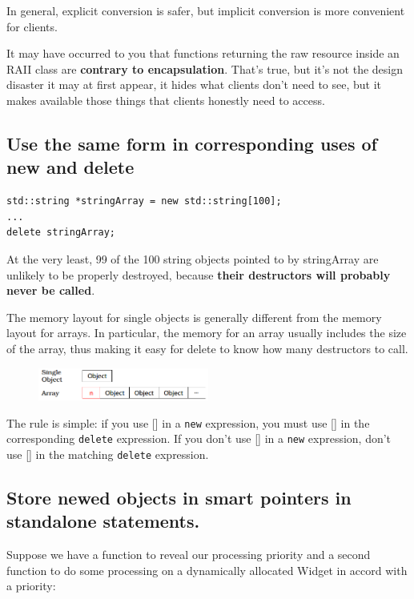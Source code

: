 \documentclass[a4paper,twoside]{article}
\theoremstyle{definition}
\theoremstyle{remark}
\numberwithin{equation}{section}
\let\OldTexttt\texttt
\renewcommand{\texttt}[1]{{\color{blue} \OldTexttt{#1}}}
\begin{document}
In general, explicit conversion is safer, but implicit conversion is
more convenient for clients.

It may have occurred to you that functions returning the raw resource
inside an RAII class are \textbf{contrary to encapsulation}.  That's
true, but it's not the design disaster it may at first appear, it
hides what clients don't need to see, but it makes available those
things that clients honestly need to access.

\subsection{Use the same form in corresponding uses of new and delete}
\label{sec:Item-16}

\begin{verbatim}
std::string *stringArray = new std::string[100];
...
delete stringArray;
\end{verbatim}

At the very least, 99 of the 100 string objects pointed to by stringArray
are unlikely to be properly destroyed, because \textbf{their
  destructors will probably never be called}.

The memory layout for single objects is generally different
from the memory layout for arrays. In particular, the memory for an
array usually includes the size of the array, thus making it easy for
delete to know how many destructors to call.

\begin{figure}[H]
  \centering
  \includegraphics[width = 0.5\textwidth]{ArrayMemLayout.png}
\end{figure}

The rule is simple: if you use [] in a \texttt{new} expression, you
must use [] in the corresponding \texttt{delete} expression. If you
don't use [] in a \texttt{new} expression, don't use [] in the
matching \texttt{delete} expression.

\subsection{Store newed objects in smart pointers in standalone statements.}
\label{sec:Item-17}

Suppose we have a function to reveal our processing priority and a
second function to do some processing on a dynamically allocated
Widget in accord with a priority:
\end{document}
